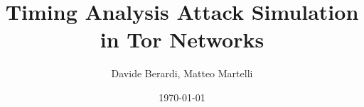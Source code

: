 \documentclass[a4paper]{article}
\title{Timing Analysis Attack Simulation in Tor Networks}
\author{Davide Berardi, Matteo Martelli}
\date{\today}
\begin{document}
\nocite{*}
\maketitle



\newpage







\end{document}
